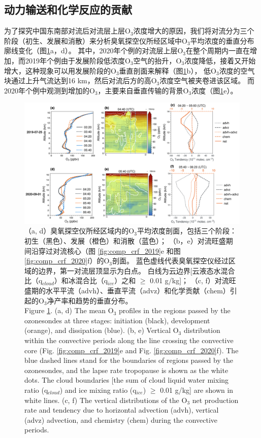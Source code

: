 \subsection{动力输送和化学反应的贡献} \label{sec:convec_impacts}

为了探究中国东南部对流后对流层上层O$_3$浓度增大的原因，我们将对流分为三个阶段（初生、发展和消散）来分析臭氧探空仪所经区域中O$_3$平均浓度的垂直分布廓线变化（图\ref{fig:tendency_o3}a，d）。
其中，2020年个例的对流层上层O$_3$在整个周期内一直在增加，而2019年个例由于发展阶段低浓度O$_3$空气的抬升，O$_3$浓度降低，接着又开始增大，这种现象可以用发展阶段的O$_3$垂直剖面来解释（图\ref{fig:tendency_o3}b），
低O$_3$浓度的空气块通过上升气流达到16 km，然后对流后方的高O$_3$浓度空气被夹卷进该区域。
而2020年个例中观测到增加的O$_3$，主要来自垂直传输的背景O$_3$浓度（图\ref{fig:tendency_o3}e）。

\begin{figure}[H]
\centering
\includegraphics[width=\textwidth]{./figures/tendency_o3.png}
\caption{
（a, d）臭氧探空仪所经区域内的O$_3$平均浓度剖面，包括三个阶段：初生（黑色）、发展（橙色）和消散（蓝色）；
（b，e）对流旺盛期间沿穿过对流核心（图 \ref{fig:comp_crf_2019}e 和图 \ref{fig:comp_crf_2020}f）的O$_3$剖面。
蓝色虚线代表臭氧探空仪经过区域的边界，第一对流层顶显示为白点。
白线为云边界[云液态水混合比（q$_{cloud}$）和冰混合比（q$_{ice}$）之和 $\geq$ 0.01 g/kg]；
（c, f）对流旺盛期的水平平流（advh）、垂直平流（advz）和化学贡献（chem）引起的O$_3$净产率和趋势的垂直分布。
\\
Figure \ref{fig:tendency_o3}. (a, d) The mean O$_3$ profiles in the regions passed by the ozonesondes
at three stages: initiation (black), development (orange), and dissipation (blue).
(b, e) Vertical O$_3$ distribution within the convective periods along the line crossing the convective core (Fig. \ref{fig:comp_crf_2019}e and Fig. \ref{fig:comp_crf_2020}f).
The blue dashed lines stand for the boundaries of regions passed by the ozonesondes, and the lapse rate tropopause is shown as the white dots.
The cloud boundaries [the sum of cloud liquid water mixing ratio (q$_{cloud}$) and ice mixing ratio (q$_{ice}$) $\geq$ 0.01 g/kg] are shown in white lines.
(c, f) The vertical distributions of the O$_3$ net production rate and tendency due to horizontal advection (advh), vertical (advz) advection, and chemistry (chem) during the convective periods.
}
\label{fig:tendency_o3}
\end{figure}

